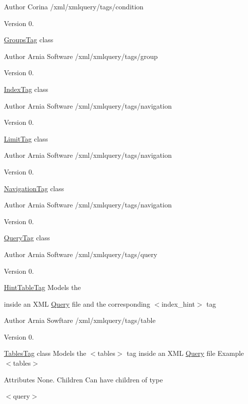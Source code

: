 \begin{DoxyAuthor}{Author}
Corina /xml/xmlquery/tags/condition 
\end{DoxyAuthor}
\begin{DoxyVersion}{Version}
0.
\end{DoxyVersion}
\hyperlink{classGroupsTag}{Groups\+Tag} class

\begin{DoxyAuthor}{Author}
Arnia Software /xml/xmlquery/tags/group 
\end{DoxyAuthor}
\begin{DoxyVersion}{Version}
0.
\end{DoxyVersion}
\hyperlink{classIndexTag}{Index\+Tag} class

\begin{DoxyAuthor}{Author}
Arnia Software /xml/xmlquery/tags/navigation 
\end{DoxyAuthor}
\begin{DoxyVersion}{Version}
0.
\end{DoxyVersion}
\hyperlink{classLimitTag}{Limit\+Tag} class

\begin{DoxyAuthor}{Author}
Arnia Software /xml/xmlquery/tags/navigation 
\end{DoxyAuthor}
\begin{DoxyVersion}{Version}
0.
\end{DoxyVersion}
\hyperlink{classNavigationTag}{Navigation\+Tag} class

\begin{DoxyAuthor}{Author}
Arnia Software /xml/xmlquery/tags/navigation 
\end{DoxyAuthor}
\begin{DoxyVersion}{Version}
0.
\end{DoxyVersion}
\hyperlink{classQueryTag}{Query\+Tag} class

\begin{DoxyAuthor}{Author}
Arnia Software /xml/xmlquery/tags/query 
\end{DoxyAuthor}
\begin{DoxyVersion}{Version}
0.
\end{DoxyVersion}
\hyperlink{classHintTableTag}{Hint\+Table\+Tag} Models the \begin{TabularC}{0}
\hline
\end{TabularC}
inside an X\+M\+L \hyperlink{classQuery}{Query} file and the corresponding $<$index\+\_\+hint$>$ tag

\begin{DoxyAuthor}{Author}
Arnia Sowftare /xml/xmlquery/tags/table 
\end{DoxyAuthor}
\begin{DoxyVersion}{Version}
0.
\end{DoxyVersion}
\hyperlink{classTablesTag}{Tables\+Tag} class Models the $<$tables$>$ tag inside an X\+M\+L \hyperlink{classQuery}{Query} file  Example $<$tables$>$ \begin{TabularC}{0}
\hline
\end{TabularC}
Attributes None. Children Can have children of type \begin{TabularC}{0}
\hline
\end{TabularC}
$<$query$>$


